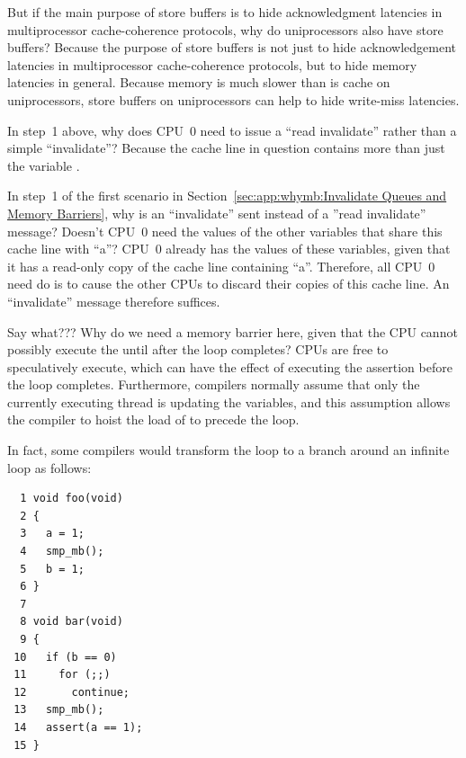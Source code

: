 \begin{enumerate}
\QuickQ{}
	But if the main purpose of store buffers is to hide acknowledgment
	latencies in multiprocessor cache-coherence protocols, why
	do uniprocessors also have store buffers?
\QuickA{}
	Because the purpose of store buffers is not just to hide
	acknowledgement latencies in multiprocessor cache-coherence protocols,
	but to hide memory latencies in general.
	Because memory is much slower than is cache on uniprocessors,
	store buffers on uniprocessors can help to hide write-miss
	latencies.

\QuickQ{}
	In step~1 above, why does CPU~0 need to issue a ``read invalidate''
	rather than a simple ``invalidate''?
\QuickA{}
	Because the cache line in question contains more than just the
	variable .

\QuickQ{}
	In step~1 of the first scenario in
	Section~\ref{sec:app:whymb:Invalidate Queues and Memory Barriers},
	why is an ``invalidate'' sent instead of a ''read invalidate''
	message?
	Doesn't CPU~0 need the values of the other variables that share
	this cache line with ``a''?
\QuickA{}
	CPU~0 already has the values of these variables, given that it
	has a read-only copy of the cache line containing ``a''.
	Therefore, all CPU~0 need do is to cause the other CPUs to discard
	their copies of this cache line.
	An ``invalidate'' message therefore suffices.

\QuickQ{}
	Say what???
	Why do we need a memory barrier here, given that the CPU cannot
	possibly execute the  until after the
	 loop completes?
\QuickA{}
	CPUs are free to speculatively execute, which can have the effect
	of executing the assertion before the  loop completes.
	Furthermore, compilers normally assume that only the currently
	executing thread is updating the variables, and this assumption
	allows the compiler to hoist the load of  to precede the
	loop.

	In fact, some compilers would transform the loop to a branch
	around an infinite loop as follows:

\vspace{5pt}
\begin{minipage}[t]{\columnwidth}
\small
\begin{verbatim}
  1 void foo(void)
  2 {
  3   a = 1;
  4   smp_mb();
  5   b = 1;
  6 }
  7 
  8 void bar(void)
  9 {
 10   if (b == 0)
 11     for (;;)
 12       continue;
 13   smp_mb();
 14   assert(a == 1);
 15 }
\end{verbatim}
\end{minipage}
\vspace{5pt}


\end{enumerate}
